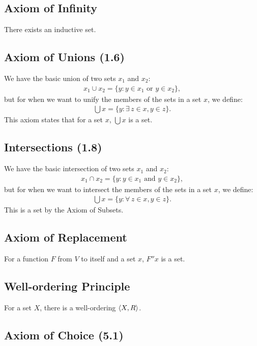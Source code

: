 \subsection{Axiom of Infinity}

There exists an inductive set.

\subsection{Axiom of Unions (1.6)} \label{1.6}

We have the basic union of two sets $x_1$ and $x_2$: \begin{align*}
    x_1 \cup x_2 = \{y : y \in x_1 \text{ or } y \in x_2\},
\end{align*} but for when we want to unify the members of the sets in
a set $x$, we define: \begin{align*}
    \bigcup x = \{y : \exists \, z \in x, y \in z\}.
\end{align*} This axiom states that for a set $x$, $\bigcup x$ is a set. 

\subsection{Intersections (1.8)} \label{1.8}

We have the basic intersection of two sets $x_1$ and $x_2$: \begin{align*}
    x_1 \cap x_2 = \{y : y \in x_1 \text{ and } y \in x_2\},
\end{align*} but for when we want to intersect the members of 
the sets in a set $x$, we define: \begin{align*}
    \bigcup x = \{y : \forall \, z \in x, y \in z\}.
\end{align*} This is a set by the Axiom of Subsets.

\subsection{Axiom of Replacement}

For a function $F$ from $V$ to itself and a set $x$, $F''x$ is a set.

\subsection{Well-ordering Principle}

For a set $X$, there is a well-ordering ${\langle X, R \rangle}$. 

\subsection{Axiom of Choice (5.1)} \label{5.1}

